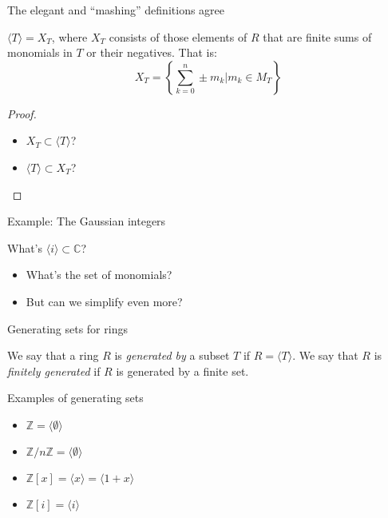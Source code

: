 \documentclass{beamer}
\newcommand{\C}{\mathbb{C}}
\begin{document}
\begin{frame}{The elegant and ``mashing'' definitions agree}

\begin{lemma} $\langle T\rangle=X_T$, where $X_T$ consists of those elements of $R$ that are finite sums of monomials in $T$ or their negatives.  That is: 
$$X_T=\left\{\sum_{k=0}^n \pm m_k \Big| m_k\in M_T\right\}$$

\end{lemma}

\begin{proof} 
\begin{itemize}
\item $X_T\subset \langle T\rangle$? 
\item $\langle T\rangle \subset X_T$?
\end{itemize}
\end{proof}

\end{frame}

\begin{frame}{Example: The Gaussian integers}

\begin{block}{What's $\langle i\rangle\subset\C$?}
  \begin{itemize}
  \item What's the set of monomials?
  \item But can we simplify even more?
  \end{itemize}
  
  
\end{block}




\end{frame}



\begin{frame}{Generating sets for rings}

\begin{definition}
We say that a ring $R$ is \emph{generated by} a subset $T$ if $R=\langle T\rangle$.  We say that $R$ is \emph{finitely generated} if $R$ is generated by a finite set.
\end{definition}

\end{frame}


\begin{frame}{Examples of generating sets}
\begin{itemize}
\item $\mathbb{Z}=\langle\emptyset\rangle $
\item $\mathbb{Z}/n\mathbb{Z}=\langle \emptyset \rangle $
\item $\mathbb{Z}[x]=\langle x \rangle=\langle 1+x\rangle $
\item $\mathbb{Z}[i]=\langle i \rangle$
\end{itemize}



\end{frame}
\end{document}
